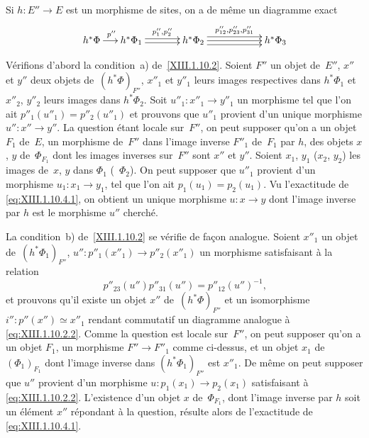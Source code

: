 Si $h \colon E'' \to E$ est un morphisme de sites, on a de m\^eme un
diagramme exact
$$
\xymatrix@C=.5cm{{h^* \Phi}\ar[r]^{p''}&{h^* \Phi_1}\ar@<2pt>[rr]^{p''_1,p''_2}\ar@<-2pt>[rr]&&{h^* \Phi_2}\ar@<4pt>[rrr]^{p''_{12},p''_{23},p''_{31}}\ar[rrr]\ar@<-4pt>[rrr]&&&{h^* \Phi_3}}
$$

V\'erifions d'abord la condition~a) de~\ref{XIII.1.10.2}. Soient
$F''$ un objet de~$E''$, $x''$ et $y''$ deux objets de~$(h^*
\Phi)_{F''}$, $x''_1$ et $y''_1$ leurs images respectives dans
$h^* \Phi_1$ et $x''_2$, $y''_2$ leurs images dans $h^*
\Phi_2$. Soit $u''_1 \colon x''_1 \to y''_1$ un morphisme tel que l'on
ait $p''_1(u''_1) = p''_2(u''_1)$ et prouvons que $u''_1$ provient
d'un unique morphisme $u'' \colon x'' \to y''$. La question \'etant
locale sur~$F''$, on peut supposer qu'on a un objet $F_1$ de~$E$, un
morphisme de~$F''$ dans l'image inverse $F''_1$ de~$F_1$ par $h$, des
objets $x$, $y$ de~$\Phi_{F_1}$ dont les images inverses sur~$F''$
sont $x''$ et $y''$. Soient $x_1$, $y_1$ (\resp $x_2$, $y_2$) les
images de~$x$, $y$ dans $\Phi_1$ (\resp~$\Phi_2$). On peut supposer
que $u''_1$ provient d'un morphisme $u_1 \colon x_1 \to y_1$, tel que
l'on ait $p_1(u_1) = p_2(u_1)$. Vu l'exactitude de
\eqref{eq:XIII.1.10.4.1}, on obtient un unique morphisme $u \colon x
\to y$ dont l'image inverse par $h$ est le morphisme $u''$
cherch\'e.

La
condition~b) de~\ref{XIII.1.10.2} se v\'erifie de fa\c con
analogue. Soient $x''_1$ un objet de~$(h^* \Phi_1)_{F''}$, $u''
\colon p''_1(x''_1) \to p''_2(x''_1)$ un morphisme satisfaisant \`a
la relation
$$
p''_{23}(u'')p''_{31}(u'')=p''_{12}(u'')^{-1} \text{,}
$$
et prouvons qu'il existe un objet $x''$ de~$(h^* \Phi)_{F''}$ et
un isomorphisme $i'' \colon p''(x'') \simeq x''_1$ rendant commutatif
un diagramme analogue \`a \eqref{eq:XIII.1.10.2.2}. Comme la
question est locale sur~$F''$, on peut supposer qu'on a un objet
$F_1$, un morphisme $F'' \to F''_1$ comme ci-dessus, et un objet $x_1$
de~$(\Phi_1)_{F_1}$ dont l'image inverse dans $(h^* \Phi_1)_{F''}$
est $x''_1$. De m\^eme on peut supposer que $u''$ provient d'un
morphisme $u \colon p_1(x_1) \to p_2(x_1)$ satisfaisant \`a
\eqref{eq:XIII.1.10.2.2}. L'existence d'un objet $x$ de~$\Phi_{F_1}$,
dont l'image inverse par $h$ soit un \'el\'ement $x''$
r\'epondant \`a la question, r\'esulte alors de l'exactitude de
\eqref{eq:XIII.1.10.4.1}.

